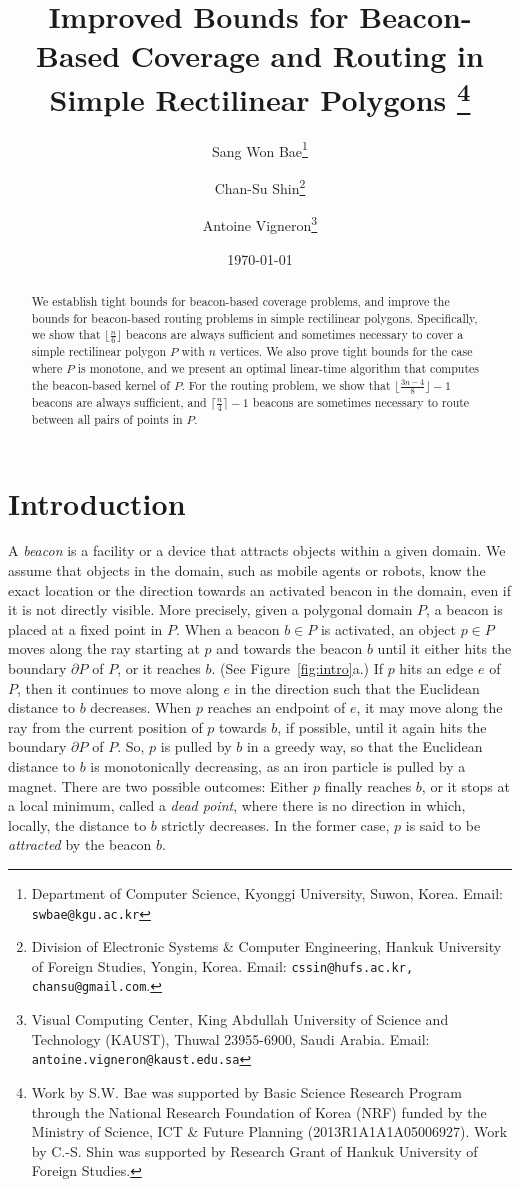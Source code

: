 \documentclass[11pt]{article}
\title{Improved Bounds for Beacon-Based Coverage and Routing in Simple Rectilinear Polygons
\thanks{Work by S.W. Bae was supported by Basic Science Research Program through the National
Research Foundation of Korea (NRF) funded by the Ministry of Science, ICT \& Future Planning
(2013R1A1A1A05006927).
Work by C.-S. Shin was supported by Research Grant of Hankuk University of Foreign Studies.
}
}
\author{Sang Won Bae\footnote{Department of Computer Science, Kyonggi University, Suwon, Korea.
Email: \texttt{swbae@kgu.ac.kr}
}
\and Chan-Su Shin\footnote{Division of Electronic Systems \& Computer Engineering,
Hankuk University of Foreign
Studies, Yongin, Korea.
Email: \texttt{cssin@hufs.ac.kr, chansu@gmail.com}.
}
\and Antoine Vigneron\footnote{Visual Computing Center,
King Abdullah University of Science and	Technology (KAUST), Thuwal 23955-6900, Saudi Arabia.
Email: \texttt{antoine.vigneron@kaust.edu.sa}
}
}
\date{\today
}
\newcommand{\bd}{\ensuremath{\partial}}
\theoremstyle{definition}
\begin{document}
\maketitle



\begin{abstract}
We establish tight bounds for beacon-based coverage problems, and improve the bounds for beacon-based routing problems in simple rectilinear polygons. 
Specifically, we show that $\lfloor \frac{n}{6} \rfloor$ beacons are always sufficient and sometimes necessary to cover a simple rectilinear polygon $P$ with $n$ vertices. 
 We also prove tight bounds for the case where $P$ is monotone,
and we present an optimal linear-time algorithm that computes the beacon-based kernel
of $P$.
For the routing problem, we show that $\lfloor \frac{3n-4}{8} \rfloor - 1$ beacons
are always sufficient, and $\lceil \frac{n}{4}\rceil-1$ beacons are sometimes necessary to route between all pairs of points in $P$.
\end{abstract}


\section{Introduction} \label{sec:intro}


A \emph{beacon} is a facility or a device that attracts objects within a given domain.
We assume that objects in the domain, such as mobile agents or robots, know the exact location
or the direction towards an activated beacon in the domain, even if it is not directly visible.
More precisely, given a polygonal domain $P$, a beacon is placed at a fixed point in $P$.
When a beacon $b \in P$ is activated, an object $p \in P$ moves along the ray
starting at  $p$ and towards the beacon $b$ until it either  hits the boundary $\bd P$ of $P$,
or it reaches $b$. (See Figure~\ref{fig:intro}a.)
If $p$ hits an edge $e$ of $P$, then it continues to move along $e$ in the direction such
that the Euclidean distance to $b$ decreases.
When $p$ reaches an endpoint of $e$, it may move along the ray from the current
position of $p$ towards $b$, if possible, until it again hits the boundary $\bd P$ of $P$.
So, $p$ is pulled by $b$ in a greedy way, so that the Euclidean distance to $b$
is monotonically decreasing, as an iron particle is pulled by a magnet.
There are two possible outcomes: Either $p$ finally reaches $b$, or it stops at a local minimum,
called a \emph{dead point}, where there is no direction in which, locally, the distance to $b$ 
strictly decreases. In the former case, $p$ is said to be \emph{attracted} by the beacon $b$. 
\end{document}
